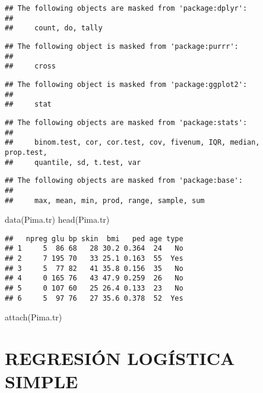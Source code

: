 \documentclass[
]{book}
\newenvironment{Shaded}{\begin{snugshade}}{\end{snugshade}}
\newcommand{\FunctionTok}[1]{\textcolor[rgb]{0.00,0.00,0.00}{#1}}
\newcommand{\NormalTok}[1]{#1}
\begin{document}
\begin{verbatim}
## The following objects are masked from 'package:dplyr':
## 
##     count, do, tally
\end{verbatim}

\begin{verbatim}
## The following object is masked from 'package:purrr':
## 
##     cross
\end{verbatim}

\begin{verbatim}
## The following object is masked from 'package:ggplot2':
## 
##     stat
\end{verbatim}

\begin{verbatim}
## The following objects are masked from 'package:stats':
## 
##     binom.test, cor, cor.test, cov, fivenum, IQR, median, prop.test,
##     quantile, sd, t.test, var
\end{verbatim}

\begin{verbatim}
## The following objects are masked from 'package:base':
## 
##     max, mean, min, prod, range, sample, sum
\end{verbatim}

\begin{Shaded}
\begin{Highlighting}[]
\FunctionTok{data}\NormalTok{(Pima.tr)}
\FunctionTok{head}\NormalTok{(Pima.tr)}
\end{Highlighting}
\end{Shaded}

\begin{verbatim}
##   npreg glu bp skin  bmi   ped age type
## 1     5  86 68   28 30.2 0.364  24   No
## 2     7 195 70   33 25.1 0.163  55  Yes
## 3     5  77 82   41 35.8 0.156  35   No
## 4     0 165 76   43 47.9 0.259  26   No
## 5     0 107 60   25 26.4 0.133  23   No
## 6     5  97 76   27 35.6 0.378  52  Yes
\end{verbatim}

\begin{Shaded}
\begin{Highlighting}[]
\FunctionTok{attach}\NormalTok{(Pima.tr)}
\end{Highlighting}
\end{Shaded}

\hypertarget{regresiuxf3n-loguxedstica-simple}{%
\chapter{REGRESIÓN LOGÍSTICA SIMPLE}\label{regresiuxf3n-loguxedstica-simple}}
\end{document}
